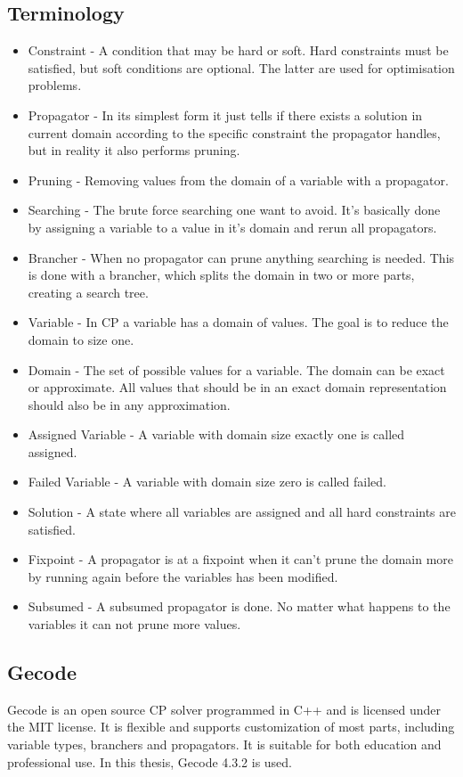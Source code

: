 \documentclass[a4paper,11pt]{article}
\begin{document}
\subsection{Terminology}
\begin{itemize}
\item{Constraint} - A condition that may be hard or soft. Hard constraints must be satisfied, but soft conditions are optional. The latter are used for optimisation problems.
\item{Propagator} - In its simplest form it just tells if there exists a solution in current domain according to the specific constraint the propagator handles, but in reality it also performs pruning.
\item{Pruning} - Removing values from the domain of a variable with a propagator.
\item{Searching} - The brute force searching one want to avoid. It's basically done by assigning a variable to a value in it's domain and rerun all propagators.
\item{Brancher} - When no propagator can prune anything searching is needed. This is done with a brancher, which splits the domain in two or more parts, creating a search tree.
\item{Variable} - In CP a variable has a domain of values. The goal is to reduce the domain to size one.
\item{Domain} - The set of possible values for a variable. The domain can be exact or approximate. All values that should be in an exact domain representation should also be in any approximation.
\item{Assigned Variable} - A variable with domain size exactly one is called assigned.
\item{Failed Variable} - A variable with domain size zero is called failed.
\item{Solution} - A state where all variables are assigned and all hard constraints are satisfied.
\item{Fixpoint} - A propagator is at a fixpoint when it can't prune the domain more by running again before the variables has been modified.
\item{Subsumed} - A subsumed propagator is done. No matter what happens to the variables it can not prune more values.
\end{itemize}

\subsection{Gecode}
Gecode is an open source CP solver programmed in C++ and is licensed under the MIT license. It is flexible and supports customization of most parts, including variable types, branchers and propagators. It is suitable for both education and professional use. In this thesis, Gecode 4.3.2 is used.
\end{document}
